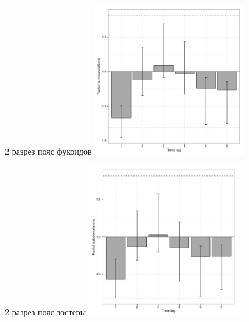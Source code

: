 \documentclass[12pt, a4paper]{disser}
\begin{document}
	\begin{figure}[ht]
	
	\begin{minipage}[b]{.46\linewidth}
	\begin{center}
	{\tiny 2 разрез пояс фукоидов}
		\includegraphics[width=65mm]{../White_Sea/dynamic_N_N1/boot_PRCF_razrez2_fucus_zone_.pdf}

	\end{center}
	\end{minipage}
	\hfil %
	\begin{minipage}[b]{.46\linewidth}
	\begin{center}
	{\tiny 2 разрез пояс зостеры}
		\includegraphics[width=65mm]{../White_Sea/dynamic_N_N1/boot_PRCF_razrez2_zostera_zone_.pdf}
	\end{center}
	\end{minipage}




\end{figure}
\end{document}
